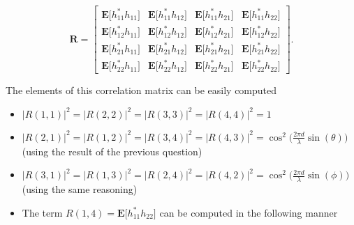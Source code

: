 \documentclass [a4paper, 11pt] {article}
\begin{document}
\begin{solution}
\begin{enumerate}
    \begin{equation}
       \mathbf{R} = \begin{bmatrix}
        \mathbf{E}\big[h^*_{11}h_{11} \big] & \mathbf{E}\big[h^*_{11}h_{12} \big] & \mathbf{E}\big[h^*_{11}h_{21} \big] & \mathbf{E}\big[h^*_{11}h_{22} \big]\\
        \mathbf{E}\big[h^*_{12}h_{11} \big] & \mathbf{E}\big[h^*_{12}h_{12} \big] & \mathbf{E}\big[h^*_{12}h_{21} \big] & \mathbf{E}\big[h^*_{12}h_{22} \big]\\
        \mathbf{E}\big[h^*_{21}h_{11} \big] & \mathbf{E}\big[h^*_{21}h_{12} \big] & \mathbf{E}\big[h^*_{21}h_{21} \big] & \mathbf{E}\big[h^*_{21}h_{22} \big]\\
        \mathbf{E}\big[h^*_{22}h_{11} \big] & \mathbf{E}\big[h^*_{22}h_{12} \big] & \mathbf{E}\big[h^*_{22}h_{21} \big] & \mathbf{E}\big[h^*_{22}h_{22} \big]
        \end{bmatrix}.
    \end{equation}
    
    The elements of this correlation matrix can be easily computed
    
    \begin{itemize}
        \item $|R(1,1)|^2 = |R(2,2)|^2 = |R(3,3)|^2 = |R(4,4)|^2 = 1$ 
        \item $|R(2,1)|^2 = |R(1,2)|^2 = |R(3,4)|^2 = |R(4,3)|^2 = \cos^2 \Big( \frac{2 \pi d}{\lambda} \sin (\theta) \Big)$ (using the result of the previous question)
        \item $|R(3,1)|^2 = |R(1,3)|^2 = |R(2,4)|^2 = |R(4,2)|^2 = \cos^2 \Big( \frac{2 \pi d}{\lambda} \sin (\phi) \Big)$ (using the same reasoning)
        \item The term $R(1,4) = \mathbf{E}\big[h^*_{11}h_{22}\big]$ can be computed in the following manner
        

\end{itemize}
\end{enumerate}
\end{solution}
\end{document}

